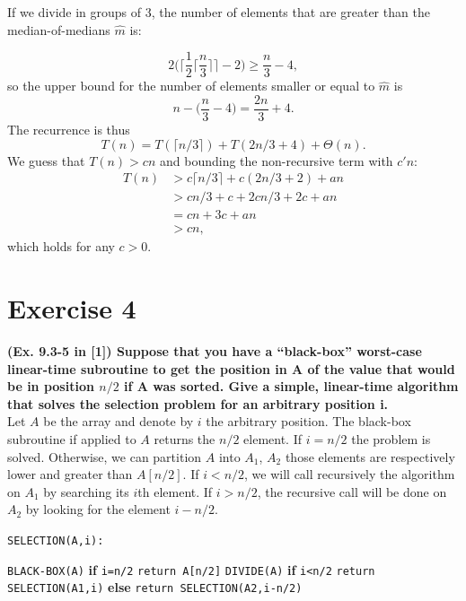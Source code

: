 \documentclass{article}
\begin{document}
	If we divide in groups of 3, the number of elements that are greater than the median-of-medians $\hat{m}$ is:
	
	$$
	2 \bigg(\bigg\lceil \frac{1}{2} \Big\lceil \frac{n}{3} \Big\rceil \bigg\rceil
	- 2 \bigg) \ge \frac{n}{3} - 4,
	$$
	so the upper bound for the number of elements smaller or equal to $\hat{m}$ is 
	$$
	n-\Big(\frac{n}{3} - 4\Big) = \frac{2n}{3} +4.
	$$
	The recurrence is thus 
	$$
	T(n) = T(\lceil n/3 \rceil) + T(2n/3 + 4) + \Theta(n).
	$$
	We guess that $T(n)>cn$ and bounding the non-recursive term with $c'n$:
	\begin{align}
	\nonumber
	T(n) & > c\lceil n/3 \rceil + c(2n/3 + 2) + an \\
	\nonumber
	& > cn/3 + c + 2cn/3 + 2c + an \\
	\nonumber
	& = cn + 3c + an \\
	\nonumber
	& > cn ,
	\end{align}
	which holds for any $c>0$.
	\newpage
	\section*{Exercise 4}
	\textbf{(Ex. 9.3-5 in [1]) Suppose that you have a “black-box” worst-case linear-time subroutine to get the position in A of the value that would be in position $n/2$ if A was sorted. Give a simple, linear-time algorithm that
	solves the selection problem for an arbitrary position i.}\\

	\noindent Let $A$ be the array and denote by $i$ the arbitrary position. The black-box subroutine if applied to $A$ returns the $n/2$ element. If $i=n/2$ the problem is solved. Otherwise, we can partition $A$ into $A_1$, $A_2$ those elements are respectively lower and greater than $A[n/2]$. If $i<n/2$, we will call recursively the algorithm on $A_1$ by searching its $i$th element. If $i>n/2$, the recursive call will be done on $A_2$ by looking for the element $i-n/2$.
	
		\begin{algorithm}
		\texttt{SELECTION(A,i):} 
		\begin{algorithmic}
			\State \texttt{BLACK-BOX(A)} 
			\State \textbf{if} \texttt{i=n/2} \texttt{return A[n/2]}
			\State \texttt{DIVIDE(A)}
			\State \textbf{if} \texttt{i<n/2} \texttt{return SELECTION(A1,i)}
			\State \textbf{else} \texttt{return SELECTION(A2,i-n/2)}
			
		\end{algorithmic}
	\end{algorithm}
	
\end{document}

